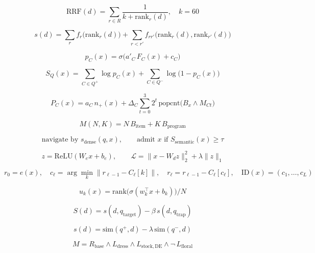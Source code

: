 
\[
\mathrm{RRF}(d)=\sum_{r\in R}\frac{1}{k+\mathrm{rank}_r(d)},\quad k=60
\]

\[
s(d)=\sum_{r} f_r\big(\mathrm{rank}_r(d)\big)+\sum_{r<r'} f_{rr'}\big(\mathrm{rank}_r(d),\mathrm{rank}_{r'}(d)\big)
\]

\[
p_C(x)=\sigma\big(a'_C\,F_C(x)+c_C\big)
\]

\[
S_Q(x)=\sum_{C\in Q^+}\log p_C(x)+\sum_{C\in Q^-}\log\big(1-p_C(x)\big)
\]

\[
P_C(x)=a_C\,n_+(x)+\Delta_C\sum_{t=0}^{3}2^t\,\mathrm{popcnt}\big(B_x\wedge M_{Ct}\big)
\]

\[
M(N,K)=N\,B_{\mathrm{item}}+K\,B_{\mathrm{program}}
\]

\[
\text{navigate by } s_{\mathrm{dense}}(q,x),\qquad \text{admit } x \text{ if } S_{\mathrm{semantic}}(x)\geq\tau
\]

\[
z=\mathrm{ReLU}(W_e x+b_e),\qquad \mathcal{L}=\lVert x-W_d z\rVert_2^2+\lambda\lVert z\rVert_1
\]

\[
r_0=e(x),\quad c_\ell=\arg\min_k\lVert r_{\ell-1}-C_\ell[k]\rVert,\quad r_\ell=r_{\ell-1}-C_\ell[c_\ell],\quad \mathrm{ID}(x)=(c_1,\dots,c_L)
\]

\[
u_k(x)=\mathrm{rank}\big(\sigma(w_k^\top x+b_k)\big)/N
\]

\[
S(d)=s(d,q_{\mathrm{target}})-\beta\,s(d,q_{\mathrm{trap}})
\]

\[
s(d)=\mathrm{sim}(q^+,d)-\lambda\,\mathrm{sim}(q^-,d)
\]

\[
M=R_{\mathrm{base}}\wedge L_{\mathrm{dress}}\wedge L_{\mathrm{stock,DE}}\wedge\neg\,L_{\mathrm{floral}}
\]
